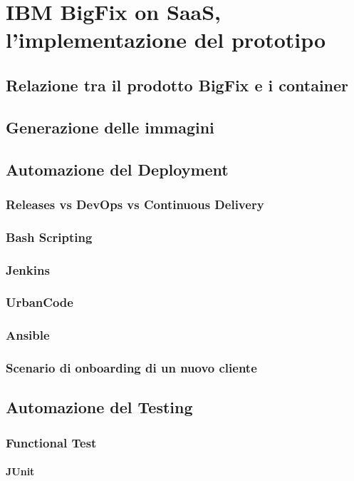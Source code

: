 \chapter{IBM BigFix on SaaS, l'implementazione del prototipo}
\section{Relazione tra il prodotto BigFix e i container}
\section{Generazione delle immagini}

\section{Automazione del Deployment}
\subsection{Releases vs DevOps vs Continuous Delivery}
\subsection{Bash Scripting}
\subsection{Jenkins}
\subsection{UrbanCode}
\subsection{Ansible}
\subsection{Scenario di onboarding di un nuovo cliente}

\section{Automazione del Testing}
\subsection{Functional Test}
\subsubsection{JUnit}
